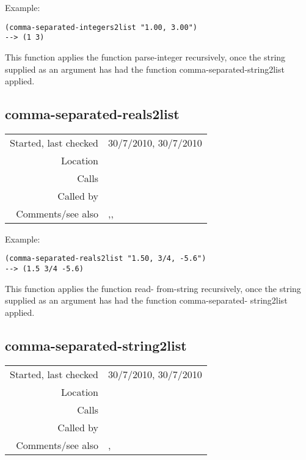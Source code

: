 \vspace{0.5cm}
\noindent Example:
\begin{verbatim}
(comma-separated-integers2list "1.00, 3.00")
--> (1 3)
\end{verbatim}

\noindent This function applies the function parse-integer recursively, once the string supplied as an
argument has had the function comma-separated-string2list applied.


\subsection*{comma-separated-reals2list}\label{fun:comma-separated-reals2list}

\vspace{0.3cm}
\begin{tabular}{r|p{8cm}}
Started, last checked & 30/7/2010, 30/7/2010 \\
Location & \nameref{sec:csv-files} \\
Calls & \nameref{fun:comma-separated-string2list} \\
Called by & \nameref{fun:csv2dataset} \\
Comments/see also & \nameref{fun:space-bar-separated-string2list},\newline \nameref{fun:tab-separated-string2list}, \newline \nameref{fun:tab-separated-reals2list}
\end{tabular}

\vspace{0.5cm}
\noindent Example:
\begin{verbatim}
(comma-separated-reals2list "1.50, 3/4, -5.6")
--> (1.5 3/4 -5.6)
\end{verbatim}

\noindent This function applies the function read-
from-string recursively, once the string supplied as
an argument has had the function comma-separated-
string2list applied.

\subsection*{comma-separated-string2list}\label{fun:comma-separated-string2list}

\vspace{0.3cm}
\begin{tabular}{r|p{8cm}}
Started, last checked & 30/7/2010, 30/7/2010 \\
Location & \nameref{sec:csv-files} \\
Calls & \nameref{fun:comma-positions} \\
Called by & \nameref{fun:comma-separated-integers2list} \\
Comments/see also & \nameref{fun:space-bar-separated-string2list},\newline \nameref{fun:tab-separated-string2list}
\end{tabular}

